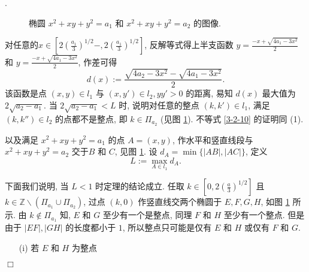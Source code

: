 \documentclass[master]{cugthesis}
\newcommand\Z{\ensuremath{\mathbb{Z}}}
\newenvironment{proof}{{\noindent\itshape 证明}.}{\hfill $\Box$\par}
\begin{document}
\begin{proof}
       \begin{figure}[ht]
        \centering
        \caption{椭圆 $x^2+xy+y^2=a_1$ 和 $x^2+xy+y^2=a_2$ 的图像.}
        \label{fig7}
    \end{figure}
  
  对任意的$x\in \left[2\left(\frac{a_1}{3}\right)^{1 /2}-,2\left(\frac{a_1}{3}\right)^{1 /2}\right]$, 反解等式得上半支函数 $y=\frac{-x+\sqrt{4a_1-3x^2}}{2}$ 和 $y=\frac{-x+\sqrt{4a_1-3x^2}}{2}$, 作差可得
  \begin{equation}
      d(x):=\frac{\sqrt{4a_2-3x^2}-\sqrt{4a_1-3x^2}}{2}.
  \end{equation}
  该函数是点 $(x,y)\in l_1$ 与 $(x,y')\in l_2, yy'>0$ 的距离, 易知 $d(x)$ 最大值为 $2\sqrt{a_2-a_1}$. 当 $2\sqrt{a_2-a_1}<L$ 时, 说明对任意的整点 $(k,k')\in l_1$, 满足 $(k,k'')\in l_2$ 的点都不是整点, 即 $k\in \Pi_{a_2}$ (见图 \ref{fig7}). 不等式 \eqref{3-2-10} 的证明同 (1).
  
  
\iffalse  以及满足 $x^2+xy+y^2=a_1$ 的点 $A=(x,y)$, 作水平和竖直线段与 $x^2+xy+y^2=a_2$ 交于$B$ 和 $C$, 见图 \ref{fig7}. 设
  $d_A=\min \lbrace|AB|,|AC|\rbrace$, 定义
  \begin{equation*}
      L:=\max\limits_{A\in l_1} d_A.
  \end{equation*}
  
  下面我们说明, 当 $L<1$ 时定理的结论成立. 任取 $k\in \left[0,2\left(\frac{a}{3}\right)^{1 /2}\right]$ 且 $k\in \Z \backslash \left(\Pi_{a_1}\cup\Pi_{a_2}\right)$, 过点 $(k,0)$ 作竖直线交两个椭圆于 $E,F,G,H$, 如图 \ref{fig7} 所示. 由 $k\notin \Pi_{a_1}$ 知, $E$ 和 $G$ 至少有一个是整点, 同理 $F$ 和 $H$ 至少有一个整点. 但是由于 $|EF|,|GH|$ 的长度都小于 $1$, 所以整点只可能是仅有 $E$ 和 $H$ 或仅有 $F$ 和 $G$. 
  \begin{enumerate}
      \item [(i)] 若 $E$ 和 $H$ 为整点
  \end{enumerate}
  

\end{proof}
\end{document}
